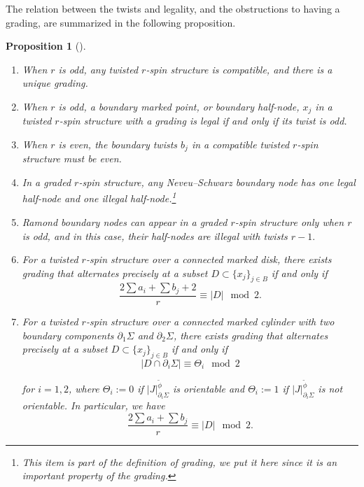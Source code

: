 \documentclass[11pt]{amsart}
\newtheorem{prop}[dummy]{Proposition}
\theoremstyle{definition}
\theoremstyle{remark}
\newcommand{\<}{\left<}
\renewcommand{\>}{\right>}
\numberwithin{equation}{section}
\begin{document}
The relation between the twists and legality, and the obstructions to having a grading, are summarized in the following proposition.
\begin{prop}[{\cite[Proposition 2.3]{BCT2}}] 
\label{prop lifting}
\begin{enumerate}
\item\label{it lift odd exist} When $r$ is odd, any twisted $r$-spin structure is compatible, and there is a unique grading.
\item\label{it lift odd legal} When $r$ is odd, a boundary marked point, or boundary half-node, $x_j$ in a twisted $r$-spin structure with a grading is legal if and only if its twist is odd.
\item\label{it lift even compatible} When $r$ is even, the boundary twists $b_j$ in a compatible twisted $r$-spin structure must be even.  

\item\label{it NS nodes}
In a graded $r$-spin structure, any Neveu--Schwarz boundary node has one legal half-node and one illegal half-node.\footnote{This item is part of the definition of grading, we put it here since it is an important property of the grading.}

\item\label{it Ramond boundary node}
Ramond boundary nodes can appear in a graded $r$-spin structure only when $r$ is odd, and in this case, their half-nodes are illegal with twists $r-1.$

\item\label{it lift compatible parity}
For a twisted $r$-spin structure over a connected marked disk, there exists grading that alternates precisely at a subset $D \subset \{x_j\}_{j \in B}$ if and only if
\begin{equation}\label{eq parity}
   \frac{2\sum a_i + \sum b_j+ 2}{r}\equiv |D| \mod 2.
\end{equation}

\item\label{it lift compatible parity g=1}
For a twisted $r$-spin structure over a connected marked cylinder with two boundary components $\partial_1 \Sigma$ and $\partial_2 \Sigma$, there exists grading that alternates precisely at a subset $D \subset \{x_j\}_{j \in B}$ if and only if
\begin{equation}\label{eq boundarywise pairty}
    |D\cap \partial_i \Sigma| \equiv  \Theta_i \mod 2
\end{equation}

for $i=1,2$, where $\Theta_i:=0$ if $|J|^{\tilde\phi}_{\partial_i\Sigma}$ is orientable and $\Theta_i:=1$ if $|J|^{\tilde\phi}_{\partial_i\Sigma}$ is not orientable.
In particular, we have
\begin{equation}\label{eq compatitable pairty g=1}
   \frac{2\sum a_i + \sum b_j}{r} \equiv |D| \mod 2.
\end{equation}

\end{enumerate}
\end{prop}
\end{document}
